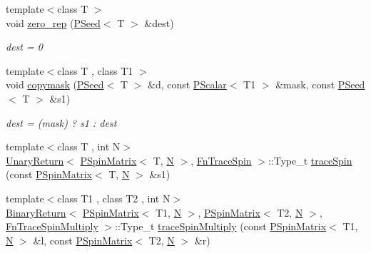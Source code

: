 \begin{DoxyCompactItemize}
\item 
{\footnotesize template$<$class T $>$ }\\void \mbox{\hyperlink{group__primseed_ga7f820f9e98c02626f49ea005894fdc65}{zero\+\_\+rep}} (\mbox{\hyperlink{classENSEM_1_1PSeed}{P\+Seed}}$<$ T $>$ \&dest)
\begin{DoxyCompactList}\small\item\em dest = 0 \end{DoxyCompactList}\item 
{\footnotesize template$<$class T , class T1 $>$ }\\void \mbox{\hyperlink{group__primseed_gaa67a317a379bde0b069fba2359e59e2e}{copymask}} (\mbox{\hyperlink{classENSEM_1_1PSeed}{P\+Seed}}$<$ T $>$ \&d, const \mbox{\hyperlink{classENSEM_1_1PScalar}{P\+Scalar}}$<$ T1 $>$ \&mask, const \mbox{\hyperlink{classENSEM_1_1PSeed}{P\+Seed}}$<$ T $>$ \&s1)
\begin{DoxyCompactList}\small\item\em dest = (mask) ? s1 \+: dest \end{DoxyCompactList}\item 
{\footnotesize template$<$class T , int N$>$ }\\\mbox{\hyperlink{structENSEM_1_1UnaryReturn}{Unary\+Return}}$<$ \mbox{\hyperlink{classENSEM_1_1PSpinMatrix}{P\+Spin\+Matrix}}$<$ T, \mbox{\hyperlink{operator__name__util_8cc_a7722c8ecbb62d99aee7ce68b1752f337}{N}} $>$, \mbox{\hyperlink{structENSEM_1_1FnTraceSpin}{Fn\+Trace\+Spin}} $>$\+::Type\+\_\+t \mbox{\hyperlink{group__primspinmatrix_gaf2ad1f1c91e0de897096d4164e090641}{trace\+Spin}} (const \mbox{\hyperlink{classENSEM_1_1PSpinMatrix}{P\+Spin\+Matrix}}$<$ T, \mbox{\hyperlink{operator__name__util_8cc_a7722c8ecbb62d99aee7ce68b1752f337}{N}} $>$ \&s1)
\item 
{\footnotesize template$<$class T1 , class T2 , int N$>$ }\\\mbox{\hyperlink{structENSEM_1_1BinaryReturn}{Binary\+Return}}$<$ \mbox{\hyperlink{classENSEM_1_1PSpinMatrix}{P\+Spin\+Matrix}}$<$ T1, \mbox{\hyperlink{operator__name__util_8cc_a7722c8ecbb62d99aee7ce68b1752f337}{N}} $>$, \mbox{\hyperlink{classENSEM_1_1PSpinMatrix}{P\+Spin\+Matrix}}$<$ T2, \mbox{\hyperlink{operator__name__util_8cc_a7722c8ecbb62d99aee7ce68b1752f337}{N}} $>$, \mbox{\hyperlink{structENSEM_1_1FnTraceSpinMultiply}{Fn\+Trace\+Spin\+Multiply}} $>$\+::Type\+\_\+t \mbox{\hyperlink{group__primspinmatrix_gab5c053ea22b374090822742e46ebd402}{trace\+Spin\+Multiply}} (const \mbox{\hyperlink{classENSEM_1_1PSpinMatrix}{P\+Spin\+Matrix}}$<$ T1, \mbox{\hyperlink{operator__name__util_8cc_a7722c8ecbb62d99aee7ce68b1752f337}{N}} $>$ \&l, const \mbox{\hyperlink{classENSEM_1_1PSpinMatrix}{P\+Spin\+Matrix}}$<$ T2, \mbox{\hyperlink{operator__name__util_8cc_a7722c8ecbb62d99aee7ce68b1752f337}{N}} $>$ \&r)

\end{DoxyCompactItemize}
